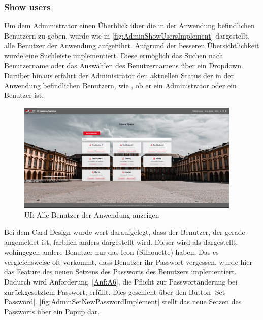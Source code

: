 \subsubsection*{Show users \faUsers}

Um dem Administrator einen Überblick über die in der Anwendung befindlichen Benutzern zu geben, wurde wie in \abb \vref{fig:AdminShowUsersImplement} dargestellt, alle Benutzer der Anwendung aufgeführt.
Aufgrund der besseren Übersichtlichkeit wurde eine Suchleiste implementiert.
Diese ermöglich das Suchen nach Benutzername oder das Auswählen des Benutzernamens über ein Dropdown.
Darüber hinaus erfährt der Administrator den aktuellen Status der in der Anwendung befindlichen Benutzern, wie \zb, ob er ein Administrator oder ein Benutzer ist.

\begin{figure}[H]
	\centering
	\includegraphics[width=0.95\textwidth, keepaspectratio]{img/client/AdminShowUsers.png}
	\captionsetup{justification=centering, format=plain}
	\caption[\acf{UI}: Alle Benutzer der Anwendung anzeigen]{\acf{UI}: Alle Benutzer der Anwendung anzeigen \\ \quelleScreenshot}
	\label{fig:AdminShowUsersImplement}
\end{figure}

Bei dem Card-Design wurde wert daraufgelegt, dass der Benutzer, der gerade angemeldet ist, farblich anders dargestellt wird.
Dieser wird als \faUser\xspace dargestellt, wohingegen andere Benutzer nur das Icon \faUser[regular]\xspace (Silhouette) haben. \newline
Das es vergleichsweise oft vorkommt, dass Benutzer ihr Passwort vergessen\autocite[vgl.][]{statistaPasswortVergessen}, wurde hier das Feature des neuen Setzens des Passworts des Benutzers implementiert.
Dadurch wird Anforderung~\ref{Anf:A6}, die Pflicht zur Passwortänderung bei zurückgesetztem Passwort, erfüllt.
Dies geschieht über den Button \jinline|Set Password|. \abb \vref{fig:AdminSetNewPasswordImplement} stellt das neue Setzen des Passworts über ein Popup dar.

